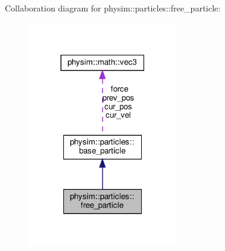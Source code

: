 Collaboration diagram for physim\+:\+:particles\+:\+:free\+\_\+particle\+:\nopagebreak
\begin{figure}[H]
\begin{center}
\leavevmode
\includegraphics[width=183pt]{classphysim_1_1particles_1_1free__particle__coll__graph}
\end{center}
\end{figure}

